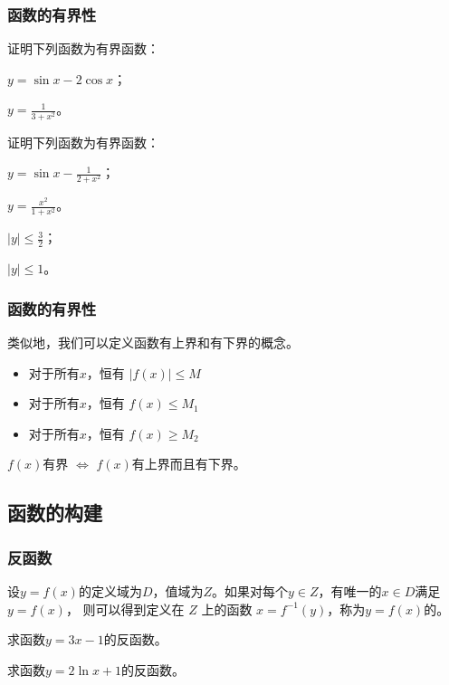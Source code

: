 \documentclass[14pt,notheorems,leqno,xcolor={rgb}]{beamer} %
\begin{document}
\begin{frame}
\frametitle{函数的有界性}
\begin{example}
证明下列函数为有界函数：
\begin{enumlite}
  \item $y=\sin x - 2\cos x$；
  \item $y=\frac1{3+x^2}$。
\end{enumlite}
\end{example}
\pause
\begin{exercise}
证明下列函数为有界函数：
\begin{enumlite}
  \item $y=\sin x -\frac{1}{2+x^2}$\pause ；
  \item $y=\frac{x^2}{1+x^2}$。
\end{enumlite}
\end{exercise}
\pause
\begin{solution}
\begin{multicols}{2}
\begin{enumlite}
  \item $|y|\le\frac32$；
  \item $|y|\le1$。
\end{enumlite}
\end{multicols}
\end{solution}
\end{frame}

\begin{iframe}
\frametitle{函数的有界性}
类似地，我们可以定义函数有上界和有下界的概念。
\begin{itemize}
  \item 对于所有$x$，恒有 $|f(x)|\leq M$ \dotfill{}
  \item 对于所有$x$，恒有 $f(x)\le M_1$ \dotfill{}
  \item 对于所有$x$，恒有 $f(x)\ge M_2$ \dotfill{}
\end{itemize}
\vpause
\begin{theorem*}
$f(x)$有界 $\Longleftrightarrow$ $f(x)$有上界而且有下界。
\end{theorem*}
\end{iframe}

\subsection{函数的构建}

\begin{frame}
\frametitle{反函数}
\begin{definition}
设$y=f(x)$的定义域为$D$，值域为$Z$。如果对每个$y\in Z$，有唯一的$x\in D$满足$y=f(x)$，
则可以得到定义在 $Z$ 上的函数 $x=f^{-1}(y)$，称为$y=f(x)$的。
\end{definition}
\vpause
\begin{example}
求函数$y=3x-1$的反函数。
\end{example}
\pause
\begin{example}
求函数$y=2\ln x+1$的反函数。
\end{example}
\end{frame}
\end{document}
